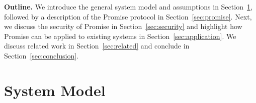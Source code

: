 \documentclass[runningheads]{llncs}
\newcommand{\sys}{Promise\xspace}
\newcommand{\dom}[1]{\todo[linecolor=green,backgroundcolor=green!25,bordercolor=green,inline,caption={}]{Comment by Dominik: #1}}
\begin{document}
\noindent\textbf{Outline.}
We introduce the general system model and assumptions in Section~\ref{sec:model}, followed by a description of the \sys protocol in Section~\ref{sec:promise}.
Next, we discuss the security of \sys in Section~\ref{sec:security} and highlight how \sys can be applied to existing systems in Section~\ref{sec:application}.
We discuss related work in Section~\ref{sec:related} and conclude in Section~\ref{sec:conclusion}.









\section{System Model}
\label{sec:model}
\end{document}

